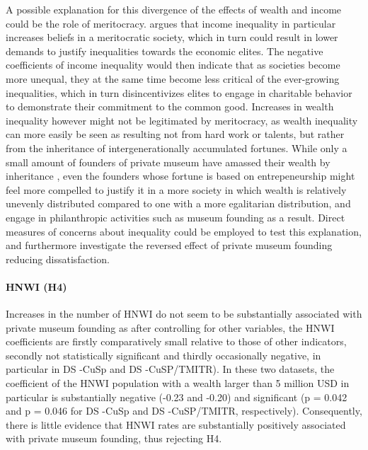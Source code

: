 \documentclass[11pt]{article}
\begin{document}
A possible explanation for this divergence of the effects of wealth and income could be the role of meritocracy.
\textcite{Mijs_2019_paradox} argues that income inequality in particular increases beliefs in a meritocratic society, which in turn could result in lower demands to justify inequalities towards the economic elites.
The negative coefficients of income inequality would then indicate that as societies become more unequal, they at the same time become less critical of the ever-growing inequalities, which in turn disincentivizes elites to engage in charitable behavior to demonstrate their commitment to the common good. 
Increases in wealth inequality however might not be legitimated by meritocracy, as wealth inequality can more easily be seen as resulting not from hard work or talents, but rather from the inheritance of intergenerationally accumulated fortunes.
While only a small amount of founders of private museum have amassed their wealth by inheritance \parencite{Velthuis_etal_2023_boom}, even the founders whose fortune is based on entrepeneurship might feel more compelled to justify it in a more society in which wealth is relatively unevenly distributed compared to one with a more egalitarian distribution, and engage in philanthropic activities such as museum founding as a result.
Direct measures of concerns about inequality could be employed to test this explanation, and furthermore investigate the reversed effect of private museum founding reducing dissatisfaction.




\paragraph*{HNWI (H4)}


Increases in the number of HNWI do not seem to be substantially associated with private museum founding as after controlling for other variables, the HNWI coefficients are firstly comparatively small relative to those of other indicators, secondly not statistically significant and thirdly occasionally negative, in particular in DS -CuSp and DS -CuSP/TMITR).
In these two datasets, the coefficient of the HNWI population with a wealth larger than 5 million USD in particular is substantially negative (-0.23 and -0.20) and significant (p = 0.042 and p = 0.046 for DS -CuSp and DS -CuSP/TMITR, respectively).
Consequently, there is little evidence that HNWI rates are substantially positively associated with private museum founding, thus rejecting H4.
\end{document}
